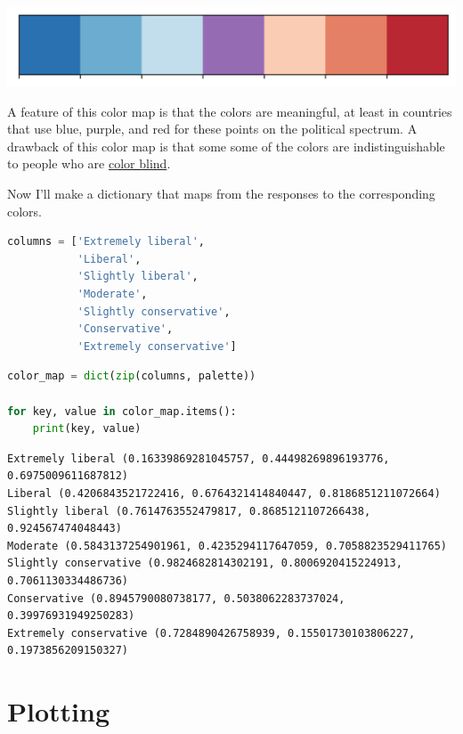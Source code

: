 \begin{center}
\includegraphics[scale=0.75]{02_polviews_files/02_polviews_78_0.png}
\end{center}

A feature of this color map is that the colors are meaningful, at least
in countries that use blue, purple, and red for these points on the
political spectrum. A drawback of this color map is that some some of
the colors are indistinguishable to people who are
\href{https://davidmathlogic.com/colorblind}{color blind}.

Now I'll make a dictionary that maps from the responses to the
corresponding colors.

\begin{lstlisting}[language=Python,style=source]
columns = ['Extremely liberal', 
           'Liberal', 
           'Slightly liberal', 
           'Moderate', 
           'Slightly conservative', 
           'Conservative',
           'Extremely conservative']
\end{lstlisting}

\begin{lstlisting}[language=Python,style=source]
color_map = dict(zip(columns, palette))

for key, value in color_map.items():
    print(key, value)
\end{lstlisting}

\begin{lstlisting}[style=output]
Extremely liberal (0.16339869281045757, 0.44498269896193776, 0.6975009611687812)
Liberal (0.4206843521722416, 0.6764321414840447, 0.8186851211072664)
Slightly liberal (0.7614763552479817, 0.8685121107266438, 0.924567474048443)
Moderate (0.5843137254901961, 0.4235294117647059, 0.7058823529411765)
Slightly conservative (0.9824682814302191, 0.8006920415224913, 0.7061130334486736)
Conservative (0.8945790080738177, 0.5038062283737024, 0.39976931949250283)
Extremely conservative (0.7284890426758939, 0.15501730103806227, 0.1973856209150327)
\end{lstlisting}

\hypertarget{plotting}{%
\section{Plotting}\label{plotting}}

